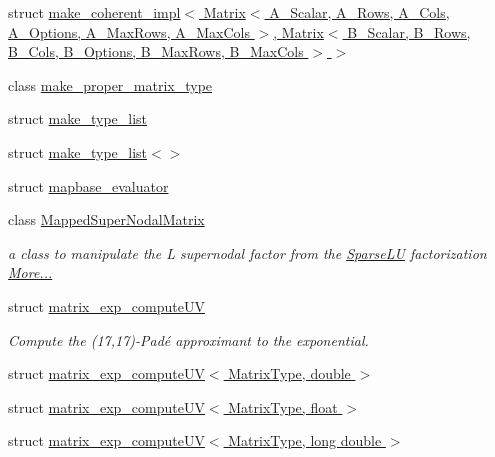 \begin{DoxyCompactItemize}
\item 
struct \hyperlink{struct_eigen_1_1internal_1_1make__coherent__impl_3_01_matrix_3_01_a___scalar_00_01_a___rows_00_02c107ffcc218caac688e11f3e382ff61}{make\+\_\+coherent\+\_\+impl$<$ Matrix$<$ A\+\_\+\+Scalar, A\+\_\+\+Rows, A\+\_\+\+Cols, A\+\_\+\+Options, A\+\_\+\+Max\+Rows, A\+\_\+\+Max\+Cols $>$, Matrix$<$ B\+\_\+\+Scalar, B\+\_\+\+Rows, B\+\_\+\+Cols, B\+\_\+\+Options, B\+\_\+\+Max\+Rows, B\+\_\+\+Max\+Cols $>$ $>$}
\item 
class \hyperlink{class_eigen_1_1internal_1_1make__proper__matrix__type}{make\+\_\+proper\+\_\+matrix\+\_\+type}
\item 
struct \hyperlink{struct_eigen_1_1internal_1_1make__type__list}{make\+\_\+type\+\_\+list}
\item 
struct \hyperlink{struct_eigen_1_1internal_1_1make__type__list_3_4}{make\+\_\+type\+\_\+list$<$$>$}
\item 
struct \hyperlink{struct_eigen_1_1internal_1_1mapbase__evaluator}{mapbase\+\_\+evaluator}
\item 
class \hyperlink{group___sparse_l_u___module_class_eigen_1_1internal_1_1_mapped_super_nodal_matrix}{Mapped\+Super\+Nodal\+Matrix}
\begin{DoxyCompactList}\small\item\em a class to manipulate the L supernodal factor from the \hyperlink{group___sparse_l_u___module_class_eigen_1_1_sparse_l_u}{Sparse\+LU} factorization  \hyperlink{group___sparse_l_u___module_class_eigen_1_1internal_1_1_mapped_super_nodal_matrix}{More...}\end{DoxyCompactList}\item 
struct \hyperlink{struct_eigen_1_1internal_1_1matrix__exp__compute_u_v}{matrix\+\_\+exp\+\_\+compute\+UV}
\begin{DoxyCompactList}\small\item\em Compute the (17,17)-\/\+Pad\'{e} approximant to the exponential. \end{DoxyCompactList}\item 
struct \hyperlink{struct_eigen_1_1internal_1_1matrix__exp__compute_u_v_3_01_matrix_type_00_01double_01_4}{matrix\+\_\+exp\+\_\+compute\+U\+V$<$ Matrix\+Type, double $>$}
\item 
struct \hyperlink{struct_eigen_1_1internal_1_1matrix__exp__compute_u_v_3_01_matrix_type_00_01float_01_4}{matrix\+\_\+exp\+\_\+compute\+U\+V$<$ Matrix\+Type, float $>$}
\item 
struct \hyperlink{struct_eigen_1_1internal_1_1matrix__exp__compute_u_v_3_01_matrix_type_00_01long_01double_01_4}{matrix\+\_\+exp\+\_\+compute\+U\+V$<$ Matrix\+Type, long double $>$}

\end{DoxyCompactItemize}
